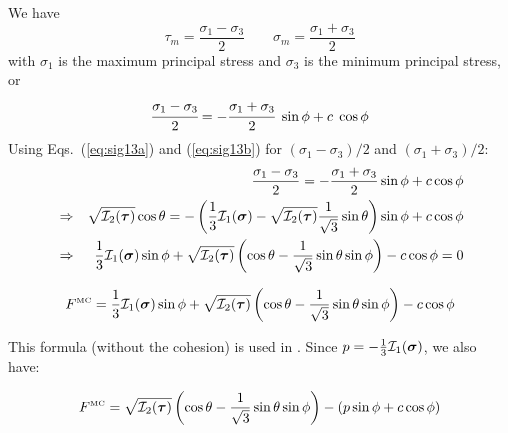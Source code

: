 We have  
\[
\tau_m=\frac{\sigma_1-\sigma_3}{2}
\qquad
\sigma_m = \frac{\sigma_1+\sigma_3}{2}
\]
with $\sigma_1$ is the maximum principal stress and $\sigma_3$ is the minimum principal stress, or
\[
\cfrac{\sigma_1-\sigma_3}{2} = 
-\cfrac{\sigma_1+\sigma_3}{2}~\sin\phi 
+c\; \cos\phi 
\]
Using Eqs.~(\ref{eq:sig13a}) and (\ref{eq:sig13b}) 
for $(\sigma_1 - \sigma_3 )/2$ and $(\sigma_1 + \sigma_3 )/2$:
\begin{eqnarray}
&& \frac{\sigma_1 - \sigma_3}{2} = -\frac{\sigma_1 + \sigma_3}{2} \sin \phi  + c \cos \phi \nonumber\\
&\Rightarrow&
\sqrt{  {\cal I}_2({\bm \tau}) } \cos \theta = -\left(\frac{1}{3}{\cal I}_1({\bm \sigma}) - \sqrt{  {\cal I}_2({\bm \tau})} \frac{1}{\sqrt{3}} \sin \theta \right) \sin \phi 
+ c \cos \phi \nonumber\\
&\Rightarrow&
\frac{1}{3} {\cal I}_1({\bm \sigma}) \sin \phi  
+ \sqrt{  {\cal I}_2({\bm \tau}) } \left( \cos \theta - \frac{1}{\sqrt{3}} \sin \theta  \sin \phi \right) - c \cos \phi = 0 \nonumber
\end{eqnarray}

\begin{mdframed}[backgroundcolor=blue!5]
\begin{equation}
F^{\text{\tiny MC}}=\frac{1}{3} {\cal I}_1({\bm \sigma}) \sin \phi  + 
\sqrt{  {\cal I}_2({\bm \tau})  } \left( \cos \theta - \frac{1}{\sqrt{3}} \sin \theta  \sin \phi \right) - c \cos \phi
\label{eq:mcF} 
\end{equation}
\end{mdframed}
This formula (without the cohesion) is used in \cite{will92}.
Since $p=-\frac{1}{3} {\cal I}_1({\bm \sigma})$, we also have:
\begin{mdframed}[backgroundcolor=blue!5]
\begin{equation}
F^{\text{\tiny MC}}=
\sqrt{  {\cal I}_2({\bm \tau})  } \left( \cos \theta - \frac{1}{\sqrt{3}} \sin \theta  \sin \phi \right) - (p \sin\phi + c \cos \phi)
\end{equation}
\end{mdframed}






